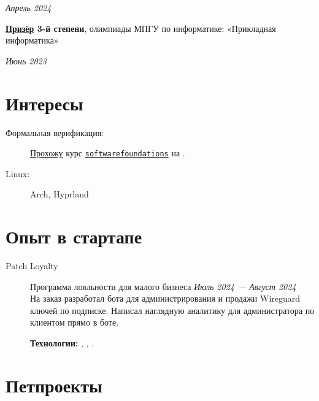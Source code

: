 \documentclass[margin,line]{resume}
\begin{document}
\begin{resume}
\hfill \textsl{Апрель 2024}

\textbf{\href{https://github.com/alchemmist/CV/blob/main/attachments/informatics-olimpic.pdf}{Призёр}
3-й степени}, олимпиады МПГУ по информатике:
«Прикладная информатика»
\vspace{-3mm}

\hfill \textsl{Июнь 2023}

\section{\mysidestyle Интересы}\vspace{1mm}
\begin{description}
  \item[Формальная верификация:]
    \href{https://github.com/alchemmist/coq-learning}{Прохожу} курс
    \texttt{\href{https://softwarefoundations.cis.upenn.edu}{softwarefoundations}}
    на .
  \item[Linux:] Arch, Hyprland
\end{description}
\vfill

\section{\mysidestyle Опыт в стартапе}\vspace{2mm}

\begin{description}

  \item[Patch Loyalty]\small Программа лояльности для малого бизнеса \hfill
    \textsl{Июль 2024 — Август 2024\vspace{1mm}}\\
    На заказ разработал бота для администрирования и продажи Wireguard
    ключей по подписке. Написал наглядную аналитику для
    администратора по клиентом прямо в боте.

    \textbf{Технологии:} ,
    , .
\end{description}

\section{\mysidestyle Петпроекты}\vspace{2mm}

\begin{description}


\end{description}
\end{resume}
\end{document}
